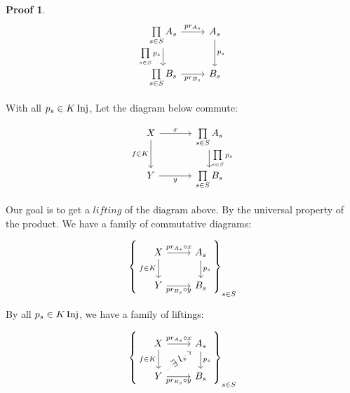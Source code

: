 \documentclass[a4paper]{article}
\theoremstyle{plain}
\theoremstyle{definition}
\newtheorem*{prf}{Proof}
\theoremstyle{remark}
\newcommand{\E}{\exists}
\DeclareMathOperator{\Inj}{\rm{Inj}}
\begin{document}
\begin{prf}
            \[\begin{tikzcd}
                {\prod\limits_{s \in S} A_s} & {A_s} \\
                {\prod\limits_{s \in S} B_s} & {B_s}
                \arrow["{\prod\limits_{s\in S}p_s}"', from=1-1, to=2-1]
                \arrow["{pr_{A_s}}", from=1-1, to=1-2]
                \arrow["{pr_{B_s}}"', from=2-1, to=2-2]
                \arrow["{p_s}", from=1-2, to=2-2]
            \end{tikzcd}\]

            With all $p_s \in K \Inj$, Let the diagram below commute:

            \[\begin{tikzcd}[column sep = 1.15cm]
                X & {\prod\limits_{s \in S} A_s} \\
                Y & {\prod\limits_{s \in S} B_s}
                \arrow["{\prod\limits_{s\in S}p_s}", from=1-2, to=2-2]
                \arrow["x", from=1-1, to=1-2]
                \arrow["y"', from=2-1, to=2-2]
                \arrow["{f \in K}"', from=1-1, to=2-1]
            \end{tikzcd}\]

            \par Our goal is to get a $lifting$ of the diagram above.
            By the universal property of the product. We have a family of commutative diagrams:

            \[ \left\{
            \begin{tikzcd}
                X & {A_s} \\
                Y & {B_s}
                \arrow["{f \in K}"', from=1-1, to=2-1]
                \arrow["{p_s}", from=1-2, to=2-2]
                \arrow["{pr_{B_s} \circ y}"', from=2-1, to=2-2]
                \arrow["{pr_{A_s} \circ x}", from=1-1, to=1-2]
            \end{tikzcd}
            \right\}_{s \in S} \]

            By all $p_s \in K \Inj$, we have a family of liftings:

            \[ \left\{
            \begin{tikzcd}
                X & {A_s} \\
                Y & {B_s}
                \arrow["{f \in K}"', from=1-1, to=2-1]
                \arrow["{p_s}", from=1-2, to=2-2]
                \arrow["{pr_{B_s} \circ y}"', from=2-1, to=2-2]
                \arrow["{pr_{A_s} \circ x}", from=1-1, to=1-2]
                \arrow["{\E\ l_s}"{marking}, dotted, from=2-1, to=1-2]
            \end{tikzcd}
            \right\}_{s \in S} \]


\end{prf}
\end{document}
